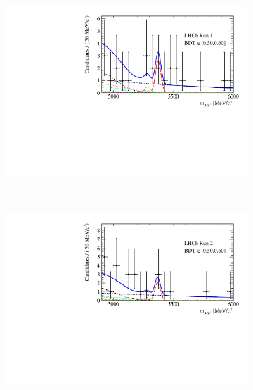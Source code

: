 {\begin{figure}[tbp]
\begin{subfigure}[b]{0.48\textwidth}
        \includegraphics[width=\textwidth]{./Figs/BFAnalysis/Fig17c.pdf}
    \end{subfigure}
    ~ %
    \begin{subfigure}[b]{0.48\textwidth}
       \includegraphics[width=\textwidth]{./Figs/BFAnalysis/Fig17g.pdf}
    \end{subfigure}
    \begin{subfigure}[b]{0.48\textwidth}

\end{subfigure}
\end{figure}}
